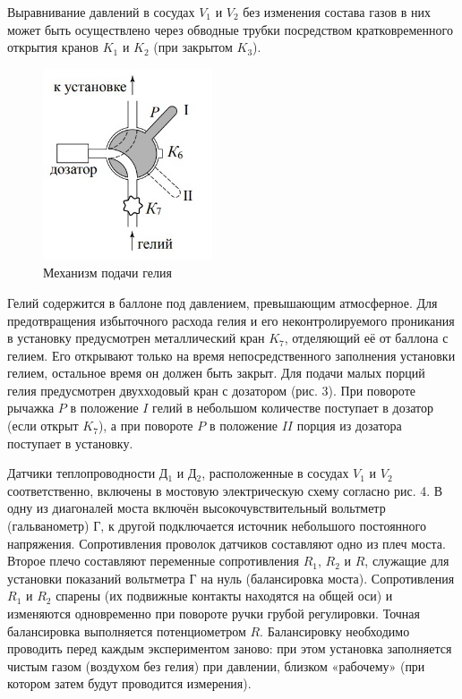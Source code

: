 \documentclass[a4paper,12pt]{article} %
\begin{document}
\medskip

\noindent Выравнивание давлений в сосудах $ V_1 $ и $ V_2 $ без изменения состава газов в них может быть осуществлено через обводные трубки посредством кратковременного открытия кранов $ K_1 $ и $ K_2 $ (при закрытом $ K_3 $).

\begin{figure}
	\includegraphics[width=5cm]{гелий.jpg}
	\caption{Механизм подачи гелия}
\end{figure}

\noindent Гелий содержится в баллоне под давлением, превышающим атмосферное. Для предотвращения избыточного расхода гелия и его неконтролируемого проникания в установку предусмотрен металлический кран $ K_7 $, отделяющий её от баллона с гелием. Его открывают только на время непосредственного заполнения установки гелием, остальное время он должен быть закрыт. Для подачи малых порций гелия предусмотрен двухходовый кран с дозатором (рис. 3). При повороте рычажка $ P $ в положение $ I $ гелий в небольшом количестве поступает в дозатор (если открыт $ K_7 $), а при повороте $ P $ в положение $ II $ порция из дозатора поступает в установку.

\medskip

\noindent Датчики теплопроводности Д$ _1 $ и Д$ _2 $, расположенные в сосудах $ V_1 $ и $ V_2 $ соответственно, включены в мостовую электрическую схему согласно рис. 4. В одну из диагоналей моста включён высокочувствительный вольтметр (гальванометр) Г, к другой подключается источник небольшого постоянного напряжения. Сопротивления проволок датчиков составляют одно из плеч моста. Второе плечо составляют переменные сопротивления $ R_1 $, $ R_2 $ и $ R $, служащие для установки показаний вольтметра Г на нуль (балансировка моста). Сопротивления $ R_1 $ и $ R_2 $ спарены (их подвижные контакты находятся на общей оси) и изменяются одновременно при повороте ручки грубой регулировки. Точная балансировка выполняется потенциометром $ R $. Балансировку необходимо проводить перед каждым экспериментом заново: при этом установка заполняется чистым газом (воздухом без гелия) при давлении, близком «рабочему» (при котором затем будут проводится измерения).
\end{document}
